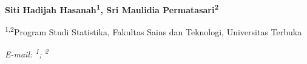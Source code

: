 \documentclass[a4paper, 12pt]{article}
\begin{document}
    
    \pagestyle{fancy}
    
    \begin{center}
        \textbf{\large\judul}
        
%        
%        
        
%       
%        

        \textbf{Siti Hadijah Hasanah\textsuperscript{1}, Sri Maulidia Permatasari\textsuperscript{2}}
        
        \textsuperscript{1,2}Program Studi Statistika, Fakultas Sains dan Teknologi, Universitas Terbuka
        
        \textit{E-mail: \textsuperscript{1}; \textsuperscript{2}}
    \end{center}
    
    
    
    \onehalfspacing %
    
    
    
    
    
    
    \nocite{*}
    
    
\end{document}
